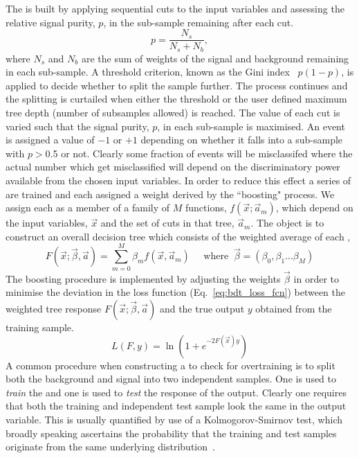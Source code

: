The \DT is built by applying sequential cuts to the input variables and assessing the relative signal purity, $p$, in the sub-sample remaining after each cut.
\begin{equation}
  p = \frac{N_{s}}{N_{s}+N_{b}},
\end{equation}
where $N_{s}$ and $N_{b}$ are the sum of weights of the signal and background remaining in each sub-sample. A threshold criterion, known as the Gini index~\cite{TMVA} $p(1-p)$, is applied to decide whether to split the sample further. The process continues and the splitting is curtailed when either the threshold or the user defined maximum tree depth (number of subsamples allowed) is reached. The value of each cut is varied such that the signal purity, $p$, in each sub-sample is maximised. An event is assigned a value of $-1$ or $+1$ depending on whether it falls into a sub-sample with $p>$0.5 or not. Clearly some fraction of events will be misclassifed where the actual number which get misclassified will depend on the discriminatory power available from the chosen input variables. In order to reduce this effect a series of \DTs are trained and each assigned a weight derived by the ``boosting" process. 
We assign each \DT as a member of a family of $M$ functions, $f(\vec{x};\vec{a}_{m})$, which depend on the input variables, $\vec{x}$ and the set of cuts in that tree, $\vec{a}_{m}$. The object is to construct an overall decision tree which consists of the weighted average of each \DT,
\begin{equation}
  F(\vec{x};\vec{\beta},\vec{a}) = \sum_{m=0}^{M} \beta_{m}f(\vec{x},\vec{a}_{m}) \;\;\;\;\; \textrm{where} \;\; \vec{\beta} = (\beta_{0},\beta_{1}...\beta_{M})
\end{equation}
The boosting procedure is implemented by adjusting the weights $\vec{\beta}$ in order to minimise the deviation in the loss function (Eq.~\ref{eq:bdt_loss_fcn}) between the weighted tree response $F(\vec{x};\vec{\beta},\vec{a})$ and the true output $y$ obtained from the training sample. 
\begin{equation}
  L(F,y) = \ln(1+e^{-2F(\vec{x})y})
  \label{eq:bdt_loss_fcn}
\end{equation}
A common procedure when constructing a \BDT to check for overtraining is to split both the background and signal into two independent samples. One is used to \emph{train} the \BDT and one is used to \emph{test} the response of the output. Clearly one requires that both the training and independent test sample look the same in the output variable. This is usually quantified by use of a Kolmogorov-Smirnov test, which broadly speaking ascertains the probability that the training and test samples originate from the same underlying distribution~\cite{kol_smir}. 

